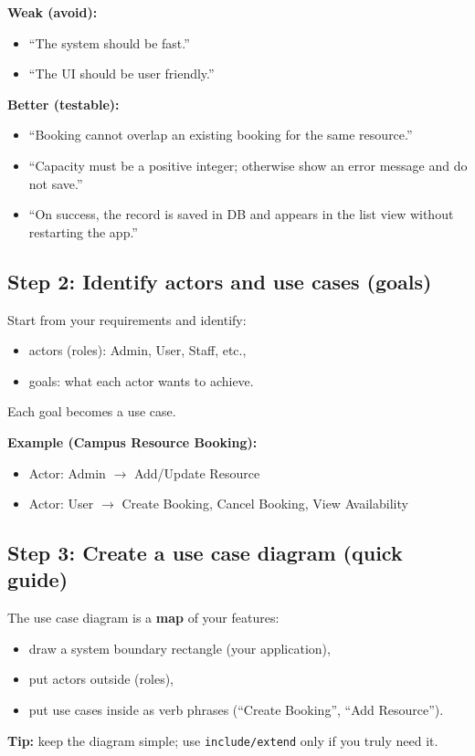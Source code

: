 \documentclass[11pt]{article}
\begin{document}
\textbf{Weak (avoid):}
\begin{itemize}
  \item ``The system should be fast.''
  \item ``The UI should be user friendly.''
\end{itemize}

\textbf{Better (testable):}
\begin{itemize}
  \item ``Booking cannot overlap an existing booking for the same resource.''
  \item ``Capacity must be a positive integer; otherwise show an error message and do not save.''
  \item ``On success, the record is saved in DB and appears in the list view without restarting the app.''
\end{itemize}

\subsection{Step 2: Identify actors and use cases (goals)}
Start from your requirements and identify:
\begin{itemize}
  \item actors (roles): Admin, User, Staff, etc.,
  \item goals: what each actor wants to achieve.
\end{itemize}
Each goal becomes a use case.

\textbf{Example (Campus Resource Booking):}
\begin{itemize}
  \item Actor: Admin $\rightarrow$ Add/Update Resource
  \item Actor: User $\rightarrow$ Create Booking, Cancel Booking, View Availability
\end{itemize}

\subsection{Step 3: Create a use case diagram (quick guide)}
The use case diagram is a \textbf{map} of your features:
\begin{itemize}
  \item draw a system boundary rectangle (your application),
  \item put actors outside (roles),
  \item put use cases inside as verb phrases (``Create Booking'', ``Add Resource'').
\end{itemize}
\textbf{Tip:} keep the diagram simple; use \texttt{include/extend} only if you truly need it.
\end{document}
